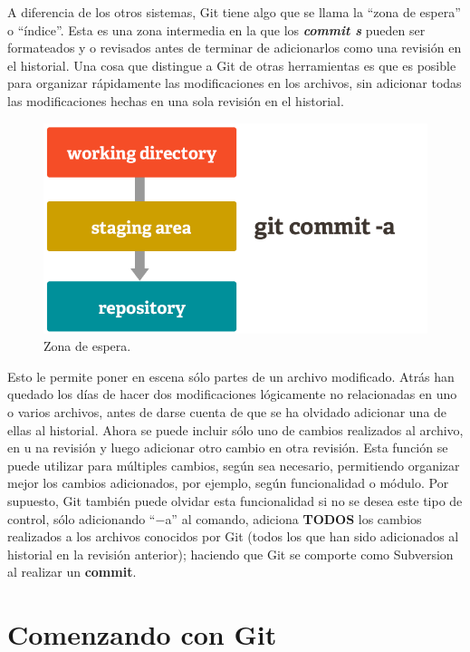\documentclass[12pt, spanish, oneside, onecolumn, a4paper]{report}
\begin{document}
A diferencia de los otros sistemas, Git tiene algo que se llama la ``zona de espera'' o ``índice''. Esta es una zona intermedia en la que los \textbf{\emph{commit s}} pueden ser formateados y o revisados antes de terminar de adicionarlos como una revisión en el historial. Una cosa que distingue a Git de otras herramientas es que es posible para organizar rápidamente las modificaciones en los archivos, sin adicionar todas las modificaciones hechas en una sola revisión en el historial. 

\begin{figure} 
  \begin{center} 
    \includegraphics[width=.6\textwidth,keepaspectratio=true]{index2.png} 
  \end{center} 
  \caption{Zona de espera.} 
\end{figure}
Esto le permite poner en escena sólo partes de un archivo modificado. Atrás han quedado los días de hacer dos modificaciones lógicamente no relacionadas en uno o varios archivos, antes de darse cuenta de que se ha olvidado adicionar una de ellas al historial. Ahora se puede incluir sólo uno de cambios realizados al archivo, en u na revisión y luego adicionar otro cambio en otra revisión. Esta función se puede utilizar para múltiples cambios, según sea necesario, permitiendo organizar mejor los cambios adicionados, por ejemplo, según funcionalidad o módulo. Por supuesto, Git también puede olvidar esta funcionalidad si no se desea este tipo de control, sólo adicionando ``$-$a'' al comando, adiciona \textbf{TODOS} los cambios realizados a los archivos conocidos por Git (todos los que han sido adicionados al historial en la revisión anterior); haciendo que Git se comporte como Subversion al realizar un 
\textbf{commit}. 
\chapter{Comenzando con Git} 
\label{chap:gettingstarted} 
\end{document}
